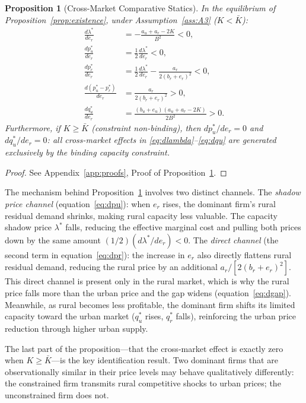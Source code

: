 \documentclass[12pt]{article}
\theoremstyle{plain}
\newtheorem{proposition}{Proposition}
\theoremstyle{definition}
\theoremstyle{remark}
\begin{document}
\begin{proposition}[Cross-Market Comparative Statics]
\label{prop:crossmarket}
In the equilibrium of Proposition~\ref{prop:existence}, under
Assumption~\ref{ass:A3} ($K < \bar{K}$):
\begin{align}
  \frac{d\lambda^*}{de_r} &= -\frac{a_u + a_r - 2K}{B^2} < 0, \label{eq:dlambda}\\[4pt]
  \frac{dp_u^*}{de_r} &= \frac{1}{2}\frac{d\lambda^*}{de_r} < 0, \label{eq:dpu}\\[4pt]
  \frac{dp_r^*}{de_r} &= \frac{1}{2}\frac{d\lambda^*}{de_r} - \frac{a_r}{2(b_r + e_r)^2} < 0,
    \label{eq:dpr}\\[4pt]
  \frac{d(p_u^* - p_r^*)}{de_r} &= \frac{a_r}{2(b_r + e_r)^2} > 0, \label{eq:dgap}\\[4pt]
  \frac{dq_u^*}{de_r} &= \frac{(b_u+e_u)(a_u + a_r - 2K)}{2B^2} > 0. \label{eq:dqu}
\end{align}
Furthermore, if $K \geq \bar{K}$ (constraint non-binding), then $dp_u^*/de_r = 0$
and $dq_u^*/de_r = 0$: all cross-market effects in
\eqref{eq:dlambda}--\eqref{eq:dqu} are generated exclusively by the binding
capacity constraint.
\end{proposition}

\begin{proof}
See Appendix~\ref{app:proofs}, Proof of Proposition~\ref{prop:crossmarket}.
\end{proof}

The mechanism behind Proposition~\ref{prop:crossmarket} involves two distinct
channels.  The \emph{shadow price channel} (equation~\eqref{eq:dpu}): when $e_r$
rises, the dominant firm's rural residual demand shrinks, making rural capacity less
valuable.  The capacity shadow price $\lambda^*$ falls, reducing the effective
marginal cost and pulling both prices down by the same amount
$(1/2)(d\lambda^*/de_r) < 0$.  The \emph{direct channel}
(the second term in equation~\eqref{eq:dpr}): the increase in $e_r$ also directly
flattens rural residual demand, reducing the rural price by an additional
$a_r/[2(b_r + e_r)^2]$.  This direct channel is present only in the rural market,
which is why the rural price falls more than the urban price and the gap widens
(equation~\eqref{eq:dgap}).  Meanwhile, as rural becomes less profitable, the
dominant firm shifts its limited capacity toward the urban market ($q_u^*$ rises,
$q_r^*$ falls), reinforcing the urban price reduction through higher urban supply.

The last part of the proposition---that the cross-market effect is exactly zero
when $K \geq \bar{K}$---is the key identification result.  Two dominant firms
that are observationally similar in their price levels may behave qualitatively
differently: the constrained firm transmits rural competitive shocks to urban
prices; the unconstrained firm does not.
\end{document}
